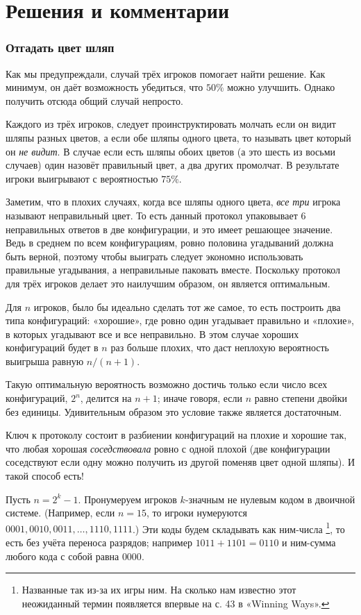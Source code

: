 \section*{Решения и комментарии}

\subsubsection*{Отгадать цвет шляп}

Как мы предупреждали, случай трёх игроков помогает найти решение.
Как минимум, он даёт возможность убедиться, что $50\%$ можно улучшить.
Однако получить отсюда общий случай непросто.

Каждого из трёх игроков, следует проинструктировать молчать если он видит шляпы разных цветов,
а если обе шляпы одного цвета, то называть цвет который он \emph{не видит}.
В случае если есть шляпы обоих цветов (а это шесть из восьми случаев) один назовёт правильный цвет, а два других промолчат.
В результате игроки выигрывают с вероятностью $75\%$.

Заметим, что в плохих случаях, когда все шляпы одного цвета, \emph{все три} игрока называют неправильный цвет.
То есть данный протокол упаковывает 6 неправильных ответов в две конфигурации, и это имеет решающее значение.
Ведь в среднем по всем конфигурациям, ровно половина угадываний должна быть верной, поэтому чтобы выиграть следует экономно использовать правильные угадывания, а неправильные паковать вместе.
Поскольку протокол для трёх игроков делает это наилучшим образом, он является оптимальным.

Для $n$ игроков, было бы идеально сделать тот же самое,
то есть построить два типа конфигураций: «хорошие», где ровно один угадывает правильно и «плохие», в которых угадывают все и все неправильно.
В этом случае хороших конфигураций будет в $n$ раз больше плохих,
что даст неплохую вероятность выигрыша равную $n/(n+1)$.

Такую оптимальную вероятность возможно достичь только если число всех конфигураций, $2^n$, делится на $n+1$;
иначе говоря, если $n$ равно степени двойки без единицы.
Удивительным образом это условие также является достаточным.

Ключ к протоколу состоит в разбиении конфигураций на плохие и хорошие так, что любая хорошая \emph{соседствовала} ровно с одной плохой (две конфигурации соседствуют если одну можно получить из другой поменяв цвет одной шляпы).
И такой способ есть!

Пусть $n=2^k-1$.
Пронумеруем игроков $k$-значным не нулевым кодом в двоичной системе.
(Например, если $n=15$, то игроки нумеруются $0001,0010,0011,\dots,1110,1111$.)
Эти коды будем складывать как ним-числа%
\footnote{Названные так из-за их игры ним. На сколько нам известно этот неожиданный термин появляется впервые на с. 43 в «Winning Ways».}, то есть без учёта переноса разрядов;
например $1011 + 1101 =0110$ и ним-сумма любого кода с собой равна $0000$.

